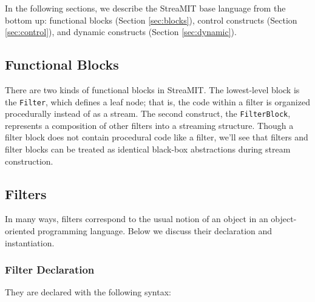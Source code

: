 \documentclass[draft]{article}
\begin{document}
In the following sections, we describe the StreaMIT base language from
the bottom up: functional blocks (Section \ref{sec:blocks}), control
constructs (Section \ref{sec:control}), and dynamic constructs
(Section \ref{sec:dynamic}).

\subsection{Functional Blocks}
\protect\label{sec:blocks}

There are two kinds of functional blocks in StreaMIT.  The
lowest-level block is the {\tt Filter}, which defines a leaf node;
that is, the code within a filter is organized procedurally instead of
as a stream.  The second construct, the {\tt FilterBlock}, represents
a composition of other filters into a streaming structure.  Though a
filter block does not contain procedural code like a filter, we'll see
that filters and filter blocks can be treated as identical black-box
abstractions during stream construction.

\subsection{Filters}

In many ways, filters correspond to the usual notion of an object in
an object-oriented programming language.  Below we discuss their
declaration and instantiation.

\subsubsection{Filter Declaration}

They are declared with the following syntax:
\end{document}
